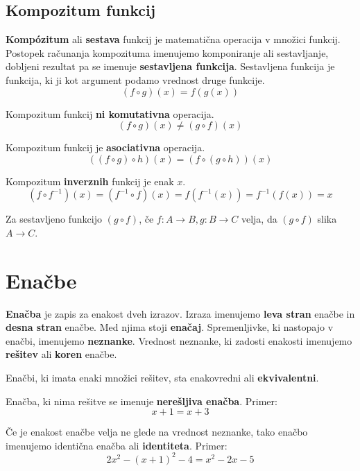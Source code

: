 \documentclass[a4paper,oneside,12pt,fleqn]{article}
\numberwithin{equation}{section}
\begin{document}
\subsection{Kompozitum funkcij}
\textbf{Komp\'{o}zitum} ali \textbf{sestava} funkcij je matematična operacija v množici funkcij.
Postopek računanja kompozituma imenujemo komponiranje ali sestavljanje, dobljeni rezultat
pa se imenuje \textbf{sestavljena funkcija}. Sestavljena funkcija je funkcija, ki ji kot argument podamo vrednost druge
funkcije.
\[ (f \circ g)(x) = f(g(x)) \]

Kompozitum funkcij \textbf{ni komutativna} operacija.
\[ (f \circ g)(x) \neq (g \circ f)(x) \]

Kompozitum funkcij je \textbf{asociativna} operacija.
\[ ( (f \circ g) \circ h)(x) = (f \circ (g \circ h))(x) \]

Kompozitum \textbf{inverznih} funkcij je enak $x$.
\[ (f \circ f^{-1})(x) = (f^{-1} \circ f)(x) = f(f^{-1}(x)) = f^{-1}(f(x)) = x \]

Za sestavljeno funkcijo $(g \circ f)$, če $f\!: A \rightarrow B, g\!: B \rightarrow C$ velja, da $(g
\circ f)$ slika $ A \rightarrow C$.

\section{Enačbe}
\label{sec:enac}
\textbf{Enačba} je zapis za enakost dveh izrazov. Izraza imenujemo \textbf{leva stran}
enačbe in \textbf{desna stran}
enačbe. Med njima stoji \textbf{enačaj}. Spremenljivke, ki nastopajo v enačbi, imenujemo
\textbf{neznanke}.
Vrednost neznanke, ki zadosti enakosti imenujemo \textbf{rešitev} ali \textbf{koren} enačbe.

Enačbi, ki imata enaki množici rešitev, sta enakovredni ali \textbf{ekvivalentni}.

Enačba, ki nima rešitve se imenuje \textbf{nerešljiva enačba}. Primer:
\[ x + 1 = x + 3 \]

Če je enakost enačbe velja ne glede na vrednost neznanke, tako enačbo imenujemo identična
enačba ali \textbf{identiteta}. Primer:
\[2x^2 -(x + 1)^2 - 4 = x^2 - 2x - 5 \]
\end{document}
